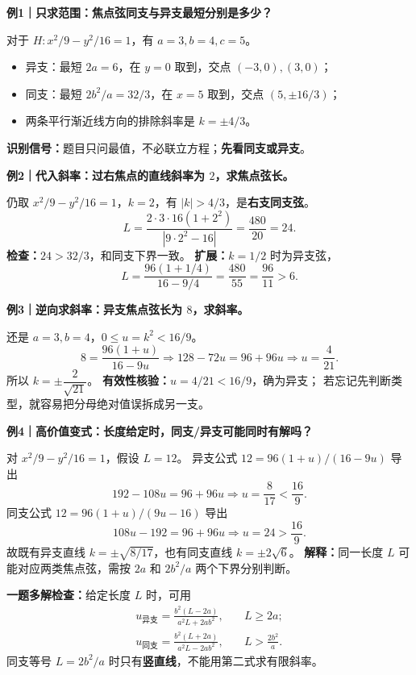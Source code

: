 \clearpage
\begin{examplebox}
\textbf{例1｜只求范围：焦点弦同支与异支最短分别是多少？}

对于 $H:x^2/9-y^2/16=1$，有 $a=3,b=4,c=5$。
\begin{center}\end{center}
\begin{itemize}
\item 异支：最短 $2a=6$，在 $y=0$ 取到，交点 $(-3,0),(3,0)$；
\item 同支：最短 $2b^2/a=32/3$，在 $x=5$ 取到，交点 $(5,\pm16/3)$；
\item 两条平行渐近线方向的排除斜率是 $k=\pm4/3$。
\end{itemize}
\textbf{识别信号：}题目只问最值，不必联立方程；\textbf{先看同支或异支}。
\end{examplebox}

\clearpage
\begin{examplebox}
\textbf{例2｜代入斜率：过右焦点的直线斜率为 $2$，求焦点弦长。}

仍取 $x^2/9-y^2/16=1$，$k=2$，有 $|k|>4/3$，是\textbf{右支同支弦}。
\[
L=\frac{2\cdot3\cdot16(1+2^2)}{|9\cdot2^2-16|}
=\frac{480}{20}=\boxed{24}.
\]
\textbf{检查：}$24>32/3$，和同支下界一致。
\textbf{扩展：}$k=1/2$ 时为异支弦，
\[
L=\frac{96(1+1/4)}{16-9/4}=\boxed{\frac{480}{55}=\frac{96}{11}}>6.
\]
\end{examplebox}

\clearpage
\begin{examplebox}
\textbf{例3｜逆向求斜率：异支焦点弦长为 $8$，求斜率。}

还是 $a=3,b=4$，$0\le u=k^2<16/9$。
\[
8=\frac{96(1+u)}{16-9u}
\Longrightarrow 128-72u=96+96u
\Longrightarrow u=\frac4{21}.
\]
所以 $\boxed{k=\pm\dfrac2{\sqrt{21}}}$。
\textbf{有效性核验：}$u=4/21<16/9$，确为异支；
若忘记先判断类型，就容易把分母绝对值误拆成另一支。
\end{examplebox}

\clearpage
\begin{examplebox}
\textbf{例4｜高价值变式：长度给定时，同支/异支可能同时有解吗？}

对 $x^2/9-y^2/16=1$，假设 $L=12$。
异支公式 $12=96(1+u)/(16-9u)$ 导出
\[
192-108u=96+96u\Longrightarrow \boxed{u=\frac8{17}}<\frac{16}{9}.
\]
同支公式 $12=96(1+u)/(9u-16)$ 导出
\[
108u-192=96+96u\Longrightarrow \boxed{u=24}>\frac{16}{9}.
\]
故既有异支直线 $k=\pm\sqrt{8/17}$，也有同支直线 $k=\pm2\sqrt6$。
\textbf{解释：}同一长度 $L$ 可能对应两类焦点弦，需按 $2a$ 和 $2b^2/a$ 两个下界分别判断。

\textbf{一题多解检查：}给定长度 $L$ 时，可用
\[
\begin{aligned}
\boxed{u_{\text{异支}}=\frac{b^2(L-2a)}{a^2L+2ab^2}},&\quad L\ge2a;\\[4pt]
\boxed{u_{\text{同支}}=\frac{b^2(L+2a)}{a^2L-2ab^2}},&\quad L>\frac{2b^2}{a}.
\end{aligned}
\]
同支等号 $L=2b^2/a$ 时只有\textbf{竖直线}，不能用第二式求有限斜率。
\end{examplebox}
